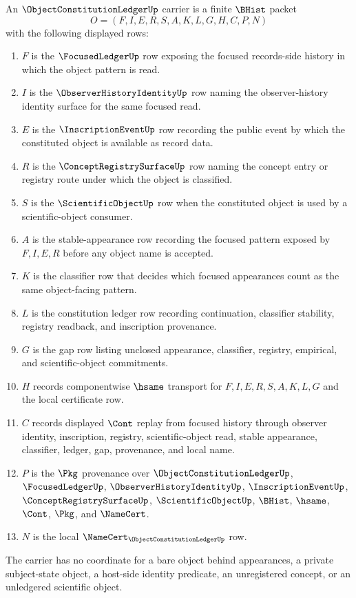 \begin{definition}
\label{def:object-constitution-ledger-carrier}
An $\ObjectConstitutionLedgerUp$ carrier is a finite $\BHist$ packet
$$
O=(F,I,E,R,S,A,K,L,G,H,C,P,N)
$$
with the following displayed rows:
\begin{enumerate}
\item $F$ is the $\FocusedLedgerUp$ row exposing the focused records-side history in which the object pattern is read.
\item $I$ is the $\ObserverHistoryIdentityUp$ row naming the observer-history identity surface for the same focused read.
\item $E$ is the $\InscriptionEventUp$ row recording the public event by which the constituted object is available as record data.
\item $R$ is the $\ConceptRegistrySurfaceUp$ row naming the concept entry or registry route under which the object is classified.
\item $S$ is the $\ScientificObjectUp$ row when the constituted object is used by a scientific-object consumer.
\item $A$ is the stable-appearance row recording the focused pattern exposed by $F,I,E,R$ before any object name is accepted.
\item $K$ is the classifier row that decides which focused appearances count as the same object-facing pattern.
\item $L$ is the constitution ledger row recording continuation, classifier stability, registry readback, and inscription provenance.
\item $G$ is the gap row listing unclosed appearance, classifier, registry, empirical, and scientific-object commitments.
\item $H$ records componentwise $\hsame$ transport for $F,I,E,R,S,A,K,L,G$ and the local certificate row.
\item $C$ records displayed $\Cont$ replay from focused history through observer identity, inscription, registry, scientific-object read, stable appearance, classifier, ledger, gap, provenance, and local name.
\item $P$ is the $\Pkg$ provenance over $\ObjectConstitutionLedgerUp$, $\FocusedLedgerUp$, $\ObserverHistoryIdentityUp$, $\InscriptionEventUp$, $\ConceptRegistrySurfaceUp$, $\ScientificObjectUp$, $\BHist$, $\hsame$, $\Cont$, $\Pkg$, and $\NameCert$.
\item $N$ is the local $\NameCert_{\ObjectConstitutionLedgerUp}$ row.
\end{enumerate}
The carrier has no coordinate for a bare object behind appearances, a private subject-state object, a host-side identity predicate, an unregistered concept, or an unledgered scientific object.
\end{definition}

